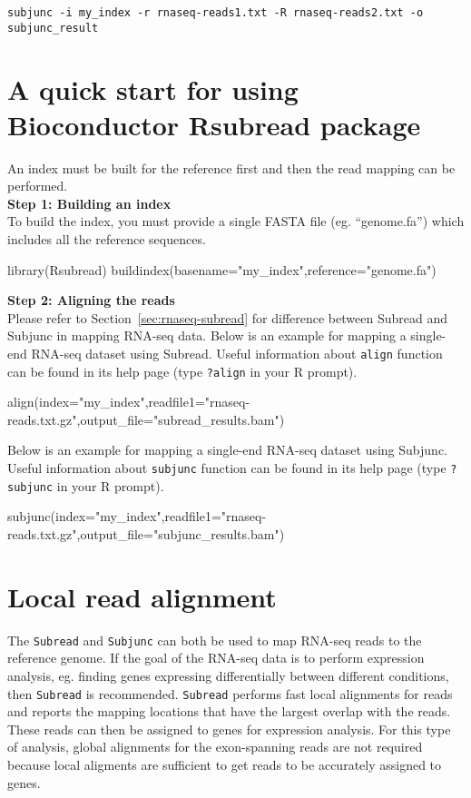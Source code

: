 \documentclass[12pt]{report}
\newcommand{\code}[1]{{\small\texttt{#1}}}
\newcommand{\Subread}{\textsf{Subread}}
\newcommand{\Subjunc}{\textsf{Subjunc}}
\newcommand{\Rsubread}{\textsf{Rsubread}}
\newcommand{\R}{\textsf{R}}
\begin{document}
\code{subjunc -i my\_index -r rnaseq-reads1.txt -R rnaseq-reads2.txt -o subjunc\_result}

\section{A quick start for using Bioconductor {\Rsubread} package}

An index must be built for the reference first and then the read mapping can be performed.\\

{\noindent\bf Step 1: Building an index}\\

\noindent To build the index, you must provide a single FASTA file (eg. ``genome.fa'') which includes all the reference sequences.

\begin{Rcode}
library(Rsubread)
buildindex(basename="my_index",reference="genome.fa")
\end{Rcode}

{\noindent\bf Step 2: Aligning the reads}\\

Please refer to Section~\ref{sec:rnaseq-subread} for difference between {\Subread} and {\Subjunc} in mapping RNA-seq data.
Below is an example for mapping a single-end RNA-seq dataset using {\Subread}.
Useful information about \code{align} function can be found in its help page (type \code{?align} in your {\R} prompt).

\begin{Rcode}
align(index="my_index",readfile1="rnaseq-reads.txt.gz",output_file="subread_results.bam")
\end{Rcode}

Below is an example for mapping a single-end RNA-seq dataset using {\Subjunc}.
Useful information about \code{subjunc} function can be found in its help page (type \code{?subjunc} in your {\R} prompt).

\begin{Rcode}
subjunc(index="my_index",readfile1="rnaseq-reads.txt.gz",output_file="subjunc_results.bam")
\end{Rcode}


\section{Local read alignment}

The \code{Subread} and \code{Subjunc} can both be used to map RNA-seq reads to the reference genome.
If the goal of the RNA-seq data is to perform expression analysis, eg. finding genes expressing differentially between different conditions, then \code{Subread} is recommended.
\code{Subread} performs fast local alignments for reads and reports the mapping locations that have the largest overlap with the reads.
These reads can then be assigned to genes for expression analysis.
For this type of analysis, global alignments for the exon-spanning reads are not required because local aligments are sufficient to get reads to be accurately assigned to genes.
\end{document}
